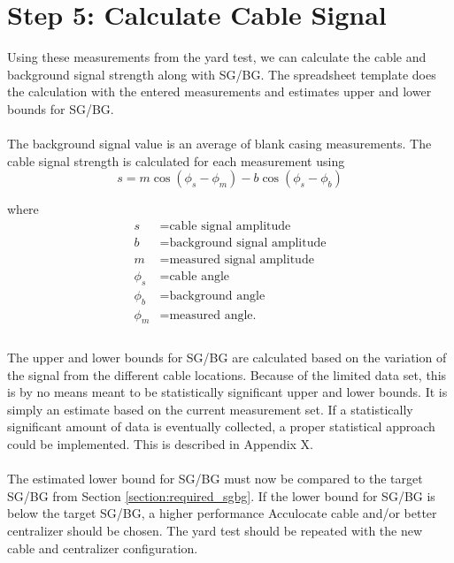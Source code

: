 \documentclass[paper=a4, fontsize=11pt]{scrartcl}
\numberwithin{equation}{section}		%
\numberwithin{figure}{section}			%
\numberwithin{table}{section}				%
\begin{document}
\section{Step 5: Calculate Cable Signal}\label{section:step_5}
Using these measurements from the yard test, we can calculate the cable and background signal strength along with SG/BG.  The spreadsheet template does the calculation with the entered measurements and estimates upper and lower bounds for SG/BG. 

\paragraph{}
The background signal value is an average of blank casing measurements.  The cable signal strength is calculated for each measurement using
\begin{equation}
    s = m \cos\left(\phi_s-\phi_m\right) - b\cos\left( \phi_s-\phi_b\right)
\end{equation}

where 
\begin{align*}
    s &= \text{cable signal amplitude}\\
    b &= \text{background signal amplitude}\\
    m &= \text{measured signal amplitude}\\
    \phi_s &= \text{cable angle}\\
    \phi_b &= \text{background angle}\\
    \phi_m &= \text{measured angle.}\\
\end{align*}

\paragraph{}
The upper and lower bounds for SG/BG are calculated based on the variation of the signal from the different cable locations.  Because of the limited data set, this is by no means meant to be statistically significant upper and lower bounds.  It is simply an estimate based on the current measurement set.  If a statistically significant amount of data is eventually collected, a proper statistical approach could be implemented.  This is described in Appendix X.

\paragraph{}
The estimated lower bound for SG/BG must now be compared to the target SG/BG from Section \ref{section:required_sgbg}.  If the lower bound for SG/BG is below the target SG/BG, a higher performance Acculocate cable and/or better centralizer should be chosen.  The yard test should be repeated with the new cable and centralizer configuration. 
\end{document}
